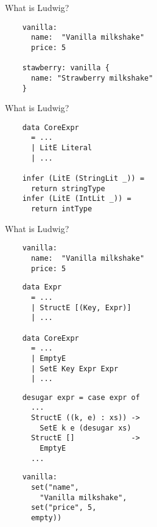 \documentclass[20pt]{beamer}
\begin{document}

\begin{frame}[fragile]{What is Ludwig?}
    \begin{lstlisting}
    vanilla:
      name:  "Vanilla milkshake"
      price: 5

    stawberry: vanilla {
      name: "Strawberry milkshake"
    }
    \end{lstlisting}
\end{frame}

\begin{frame}[fragile]{What is Ludwig?}
    \begin{lstlisting}
    data CoreExpr
      = ...
      | LitE Literal
      | ...

    infer (LitE (StringLit _)) =
      return stringType
    infer (LitE (IntLit _)) =
      return intType
    \end{lstlisting}
\end{frame}

\begin{frame}[fragile]{What is Ludwig?}
    \begin{lstlisting}
    vanilla:
      name:  "Vanilla milkshake"
      price: 5
    \end{lstlisting}
\end{frame}

\begin{frame}
    \begin{lstlisting}
    data Expr
      = ...
      | StructE [(Key, Expr)]
      | ...

    data CoreExpr
      = ...
      | EmptyE
      | SetE Key Expr Expr
      | ...
    \end{lstlisting}
\end{frame}

\begin{frame}
    \begin{lstlisting}
    desugar expr = case expr of
      ...
      StructE ((k, e) : xs)) ->
        SetE k e (desugar xs)
      StructE []             ->
        EmptyE
      ...
    \end{lstlisting}
\end{frame}

\begin{frame}
    \begin{lstlisting}
    vanilla:
      set("name",
        "Vanilla milkshake",
      set("price", 5,
      empty))
    \end{lstlisting}
\end{frame}
\end{document}
